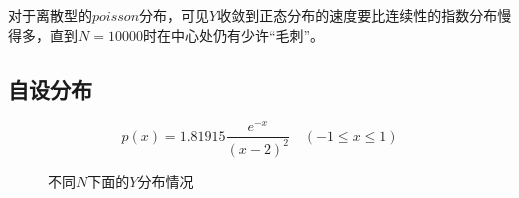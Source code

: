 \documentclass[UTF8]{ctexart}
\begin{document}
	\begin{flushleft}
		\quad 对于离散型的$poisson$分布，可见$Y$收敛到正态分布的速度要比连续性的指数分布慢得多，直到$N=10000$时在中心处仍有少许“毛刺”。
	\end{flushleft}

\subsection{自设分布}
$$p(x)=1.81915\frac{e^{-x}}{{(x-2)^2}}\quad (-1\leq x\leq1)$$
\begin{figure}[H]
	\centering  %
	
		
	\caption{不同$N$下面的$Y$分布情况}
\end{figure}
\end{document}

